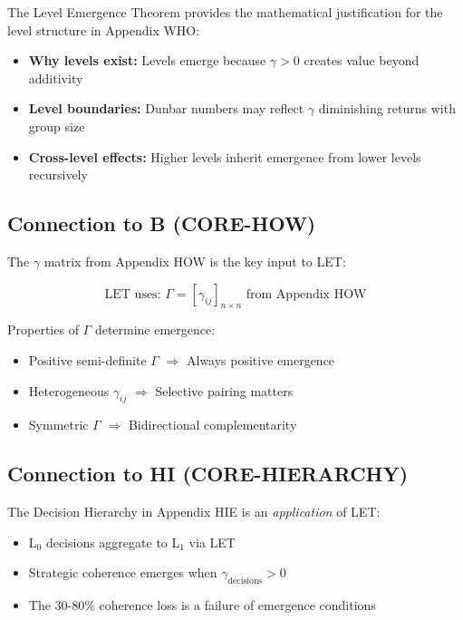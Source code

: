 The Level Emergence Theorem provides the mathematical justification for the
level structure in Appendix WHO:

\begin{itemize}
\item \textbf{Why levels exist:} Levels emerge because $\gamma > 0$ creates
value beyond additivity
\item \textbf{Level boundaries:} Dunbar numbers may reflect $\gamma$
diminishing returns with group size
\item \textbf{Cross-level effects:} Higher levels inherit emergence from
lower levels recursively
\end{itemize}

\subsection{Connection to B (CORE-HOW)}

The $\gamma$ matrix from Appendix HOW is the key input to LET:

\begin{equation}
\text{LET uses: } \Gamma = [\gamma_{ij}]_{n \times n} \text{ from Appendix HOW}
\end{equation}

Properties of $\Gamma$ determine emergence:
\begin{itemize}
\item Positive semi-definite $\Gamma$ $\Rightarrow$ Always positive emergence
\item Heterogeneous $\gamma_{ij}$ $\Rightarrow$ Selective pairing matters
\item Symmetric $\Gamma$ $\Rightarrow$ Bidirectional complementarity
\end{itemize}

\subsection{Connection to HI (CORE-HIERARCHY)}

The Decision Hierarchy in Appendix HIE is an \textit{application} of LET:

\begin{itemize}
\item L$_0$ decisions aggregate to L$_1$ via LET
\item Strategic coherence emerges when $\gamma_{\text{decisions}} > 0$
\item The 30-80\% coherence loss is a failure of emergence conditions
\end{itemize}

